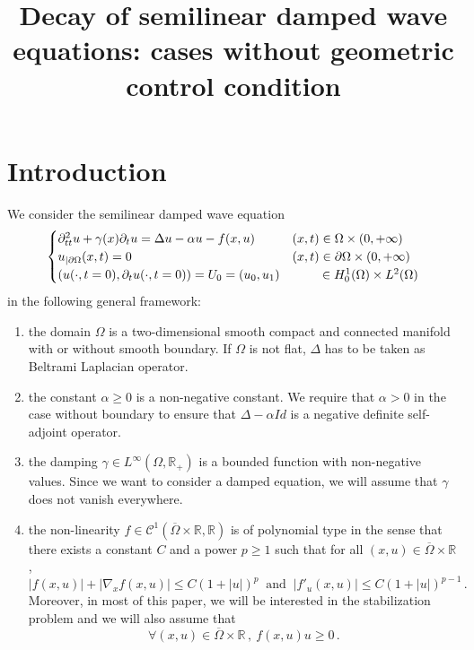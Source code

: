 \documentclass[AHL,Unicode,longabstracts]{cedram}
\title[Decay of semilinear damped wave equations]{Decay of semilinear damped wave equations: cases without geometric control condition}
\author{\firstname{Romain} \lastname{Joly}}
\author{\firstname{Camille} \lastname{Laurent}}
\newcommand{\RR}{\mathbb{R}}
\newcommand{\Cc}{\mathcal{C}}
\newcommand{\grad}{\nabla}
\newcommand*{\romanenumi}{\renewcommand*{\theenumi}{\roman{enumi}}}
\let\oldforall\forall
\renewcommand*{\forall}{\mathrel{\oldforall}}
\begin{document}
\maketitle


\section{Introduction}

We consider the semilinear damped wave equation
\begin{equation}\label{eq}
\begin{cases}
\partial_{tt}^2 u + \gamma(x)\partial_t u = \Delta u - \alpha u - f(x,u)\:&(x,t)\in\Omega\times (0,+\infty)\\
u_{|\partial\Omega}(x,t)=0&(x,t)\in\partial\Omega\times (0,+\infty)\\
\left(u(\cdot,t=0),\partial_t u(\cdot,t=0)\right)=U_0=(u_0,u_1)& \mkern43mu\in H^1_0(\Omega)\times L^2(\Omega)
\end{cases}
\end{equation}
in the following general framework:
\begin{enumerate}\romanenumi
\item \label{listintro1.1}the domain $\Omega$ is a two-dimensional smooth compact and connected manifold with or without smooth boundary. If $\Omega$ is not flat, $\Delta$ has to be taken as Beltrami Laplacian operator.
\item \label{listintro1.2}the constant $\alpha\geq 0$ is a non-negative constant. We require that $\alpha>0$ in the case without boundary to ensure that $\Delta-\alpha Id$ is a negative definite self-adjoint operator.
\item \label{listintro1.3}the damping $\gamma\in L^\infty(\Omega,\RR_+)$ is a bounded function with non-negative values. Since we want to consider a damped equation, we will assume that $\gamma$ does not vanish everywhere.
\item \label{listintro1.4}the non-linearity $f\in\Cc^1(\overline\Omega\times\RR,\RR)$ is of polynomial type in the sense that there exists a constant $C$ and a power $p\geq 1$ such that for all $(x,u)\in \overline\Omega\times\RR$,
\begin{equation}\label{hyp-f-estim}
|f(x,u)|+|\grad_xf(x,u)|\leq C(1+|u|)^p\:\text{ and }\:|f'_u(x,u)|\leq C(1+|u|)^{p-1}\,.
\end{equation}
Moreover, in most of this paper, we will be interested in the stabilization problem and we will also assume that
\begin{equation}\label{hyp-f-sign}
\forall (x,u)\in \overline\Omega\times\RR\,,\:f(x,u)u\geq 0\,.
\end{equation}
\end{enumerate}
\end{document}
